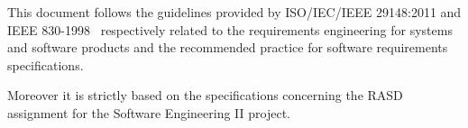 This document follows the guidelines provided by ISO/IEC/IEEE 29148:2011\cite{ieee-29148} and IEEE 830-1998~\cite{ieee-830} respectively related to the requirements engineering for systems and software products and the recommended practice for software requirements specifications.

Moreover it is strictly based on the specifications concerning the RASD assignment\cite{se-assignments} for the Software Engineering II project.